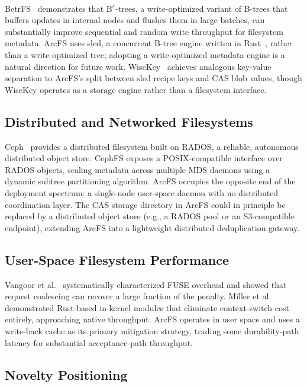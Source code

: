 \documentclass[5p,times]{elsarticle}
\begin{document}
BetrFS~\cite{jannen2015betrfs} demonstrates that
B\textsuperscript{$\varepsilon$}-trees, a write-optimized variant of B-trees
that buffers updates in internal nodes and flushes them in large batches, can
substantially improve sequential and random write throughput for filesystem
metadata.  ArcFS uses sled, a concurrent B-tree engine written in
Rust~\cite{sled2024}, rather than a write-optimized tree; adopting a
write-optimized metadata engine is a natural direction for future work.
WiscKey~\cite{lu2017wisckey} achieves analogous key-value separation to
ArcFS's split between sled recipe keys and CAS blob values, though WiscKey
operates as a storage engine rather than a filesystem interface.

\subsection{Distributed and Networked Filesystems}

Ceph~\cite{weil2006ceph} provides a distributed filesystem built on RADOS,
a reliable, autonomous distributed object store. CephFS exposes a
POSIX-compatible interface over RADOS objects, scaling metadata across
multiple MDS daemons using a dynamic subtree partitioning algorithm.
ArcFS occupies the opposite end of the deployment spectrum: a single-node
user-space daemon with no distributed coordination layer.  The CAS storage
directory in ArcFS could in principle be replaced by a distributed object
store (e.g., a RADOS pool or an S3-compatible endpoint), extending ArcFS
into a lightweight distributed deduplication gateway.

\subsection{User-Space Filesystem Performance}

Vangoor et al.~\cite{vangoor2017fuse} systematically characterized FUSE
overhead and showed that request coalescing can recover a large fraction of
the penalty. Miller et al.~\cite{miller2021bento} demonstrated Rust-based
in-kernel modules that eliminate context-switch cost entirely, approaching
native throughput. ArcFS operates in user space and uses a write-back cache
as its primary mitigation strategy, trading some durability-path latency for
substantial acceptance-path throughput.

\subsection{Novelty Positioning}
\end{document}
